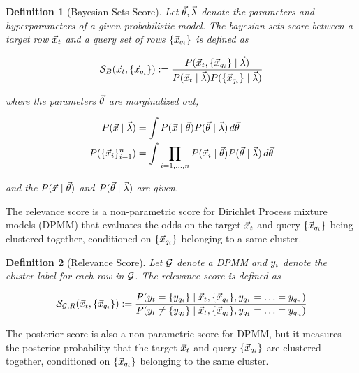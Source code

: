 \documentclass{article}
\newcommand{\set}[1]{\{{#1}\}}
\theoremstyle{break}
\newtheorem{definition}{Definition}[section]
\begin{document}
    \begin{definition}[Bayesian Sets Score]
      Let $\vec \theta, \vec \lambda$ denote the parameters and hyperparameters of a
      given probabilistic model. The bayesian sets score between a
      target row $\vec x_t$ and a query set of rows $\queryset$ is defined as
      
      \begin{equation}
        \mS_B(\target, \queryset) :=
            \frac {P(\target, \queryset \mid \hypers)}
                {P(\target \mid \hypers) {P(\queryset \mid \hypers)}}
      \end{equation}

      where the parameters $\vec \theta$ are marginalized out,
      
      \begin{align*}
        P(\vec x \mid \hypers) &= \int P(\vec x \mid \params)
            P(\params \mid \hypers) \, d\params \\
        P(\set{\vec x_i}_{i=1}^n) &= \int \prod_{i=1, \ldots, n} 
            P(\vec x_i \mid \params) P(\params \mid \hypers) \, d\params
      \end{align*}

      and the $P(\vec x \mid \vec \theta)$ and $P(\vec \theta \mid \vec \lambda)$ are
      given.
    \end{definition}

     The relevance score is a non-parametric score for Dirichlet Process mixture
     models (DPMM) that evaluates the odds on the target $\vec x_t$ and query
     $\queryset$ being clustered together, conditioned on $\queryset$ belonging
     to a same cluster.
 
    \begin{definition}[Relevance Score]
      Let $\mathcal{G}$ denote a DPMM and $y_i$ denote the
      cluster label for each row in $\mathcal{G}$. The relevance score is defined as
      
      \begin{equation}
        \rscore (\target, \queryset) := \frac 
            {P(\yt = \yqset \mid \target, \queryset, \sameyq)}
            {P(\yt \neq \yqset \mid \target, \queryset, \sameyq)}
      \end{equation}
    \end{definition}

    The posterior score is also a non-parametric score for DPMM, but it measures
    the posterior probability that the target $\vec x_t$ and query $\queryset$
    are clustered together, conditioned on $\queryset$ belonging to the same
    cluster.
\end{document}
